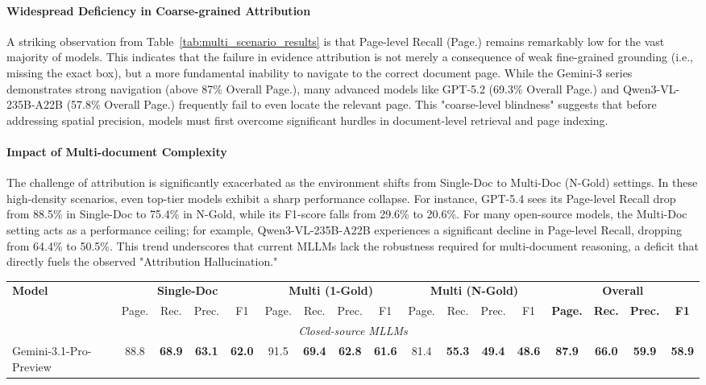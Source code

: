 \documentclass{llmxive}
\providecommand{\highlightblue}[1]{\colorbox[HTML]{bae6fb}{\textbf{#1}}}
\providecommand{\arraystretch}{1.1}
\begin{document}
{{{\paragraph{Widespread Deficiency in Coarse-grained Attribution} A striking observation from Table~\ref{tab:multi_scenario_results} is that Page-level Recall (Page.) remains remarkably low for the vast majority of models. This indicates that the failure in evidence attribution is not merely a consequence of weak fine-grained grounding (i.e., missing the exact box), but a more fundamental inability to navigate to the correct document page. While the Gemini-3 series demonstrates strong navigation (above 87\% Overall Page.), many advanced models like GPT-5.2 (69.3\% Overall Page.) and Qwen3-VL-235B-A22B (57.8\% Overall Page.) frequently fail to even locate the relevant page. This "coarse-level blindness" suggests that before addressing spatial precision, models must first overcome significant hurdles in document-level retrieval and page indexing.

\paragraph{Impact of Multi-document Complexity} The challenge of attribution is significantly exacerbated as the environment shifts from Single-Doc to Multi-Doc (N-Gold) settings. In these high-density scenarios, even top-tier models exhibit a sharp performance collapse. For instance, GPT-5.4 sees its Page-level Recall drop from 88.5\% in Single-Doc to 75.4\% in N-Gold, while its F1-score falls from 29.6\% to 20.6\%. For many open-source models, the Multi-Doc setting acts as a performance ceiling; for example, Qwen3-VL-235B-A22B experiences a significant decline in Page-level Recall, dropping from 64.4\% to 50.5\%. This trend underscores that current MLLMs lack the robustness required for multi-document reasoning, a deficit that directly fuels the observed "Attribution Hallucination."

\begin{table}[htbp]
\centering
\scriptsize
\renewcommand{\arraystretch}{1.25}
\setlength{\tabcolsep}{1.0pt}
\begin{tabular}{@{}l cccc cccc cccc >{\bfseries}c>{\bfseries}c>{\bfseries}c>{\bfseries}c@{}}
\toprule
\multirow{2.5}{*}{\textbf{Model}} & \multicolumn{4}{c}{\textbf{Single-Doc}} & \multicolumn{4}{c}{\textbf{Multi (1-Gold)}} & \multicolumn{4}{c}{\textbf{Multi (N-Gold)}} & \multicolumn{4}{c}{\textbf{Overall}} \\
\cmidrule(lr){2-5} \cmidrule(lr){6-9} \cmidrule(lr){10-13} \cmidrule(l){14-17}
& Page. & Rec. & Prec. & F1 & Page. & Rec. & Prec. & F1 & Page. & Rec. & Prec. & F1 & Page. & Rec. & Prec. & F1 \\ \midrule
\multicolumn{17}{c}{\textit{Closed-source MLLMs}} \\ \midrule
Gemini-3.1-Pro-Preview &88.8&\highlightblue{68.9}&\highlightblue{63.1}&\highlightblue{62.0}&91.5&\highlightblue{69.4}&\highlightblue{62.8}&\highlightblue{61.6}&81.4&\highlightblue{55.3}&\highlightblue{49.4}&\highlightblue{48.6}&87.9&\highlightblue{66.0}&\highlightblue{59.9}&\highlightblue{58.9} \\


\end{tabular}
\end{table}}}}
\end{document}
